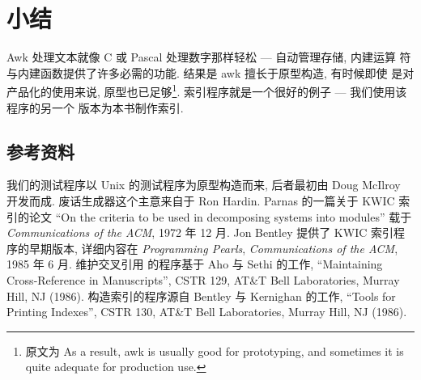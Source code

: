 \section{小结}
\label{sec:processing_words_summary}

Awk 处理文本就像 C 或 Pascal 处理数字那样轻松 --- 自动管理存储, 内建运算
符与内建函数提供了许多必需的功能. 结果是 awk 擅长于原型构造, 有时候即使
是对产品化的使用来说, 原型也已足够\footnote{原文为 As a result, awk is
    usually good for prototyping, and sometimes it is quite adequate for
production use.}. 索引程序就是一个很好的例子 --- 我们使用该程序的另一个
版本为本书制作索引.

\subsection*{参考资料}
我们的测试程序以 Unix 的测试程序为原型构造而来, 后者最初由 Doug McIlroy
开发而成. 废话生成器这个主意来自于 Ron Hardin. Parnas 的一篇关于
KWIC 索引的论文 ``On the criteria to be used in decomposing systems into
modules'' 载于 \textit{Communications of the ACM}, 1972 年 12 月.
Jon Bentley 提供了 KWIC 索引程序的早期版本, 详细内容在 \textit{Programming
Pearls}, \textit{Communications of the ACM}, 1985 年 6 月. 维护交叉引用
的程序基于 Aho 与 Sethi 的工作, ``Maintaining Cross-Reference in
Manuscripts'', CSTR 129, AT\&T Bell Laboratories, Murray Hill, NJ (1986).
构造索引的程序源自 Bentley 与 Kernighan 的工作, ``Tools for Printing
Indexes'', CSTR 130, AT\&T Bell Laboratories, Murray Hill, NJ (1986).
